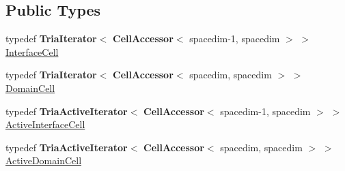 \subsection*{Public Types}
\begin{DoxyCompactItemize}
\item 
typedef {\bf Tria\+Iterator}$<$ {\bf Cell\+Accessor}$<$ spacedim-\/1, spacedim $>$ $>$ \hyperlink{class_triangulation_system_a1d62a56e335cf19f4a4ec7932fbaef09}{Interface\+Cell}
\item 
typedef {\bf Tria\+Iterator}$<$ {\bf Cell\+Accessor}$<$ spacedim, spacedim $>$ $>$ \hyperlink{class_triangulation_system_af53de5ec80a16d9cb167660b2832b240}{Domain\+Cell}
\item 
typedef {\bf Tria\+Active\+Iterator}$<$ {\bf Cell\+Accessor}$<$ spacedim-\/1, spacedim $>$ $>$ \hyperlink{class_triangulation_system_a4c3f97884b5478ebd6771433c5273ac5}{Active\+Interface\+Cell}
\item 
typedef {\bf Tria\+Active\+Iterator}$<$ {\bf Cell\+Accessor}$<$ spacedim, spacedim $>$ $>$ \hyperlink{class_triangulation_system_a6aa358f6803facdc7e7ee72698a5f4cb}{Active\+Domain\+Cell}
\end{DoxyCompactItemize}

